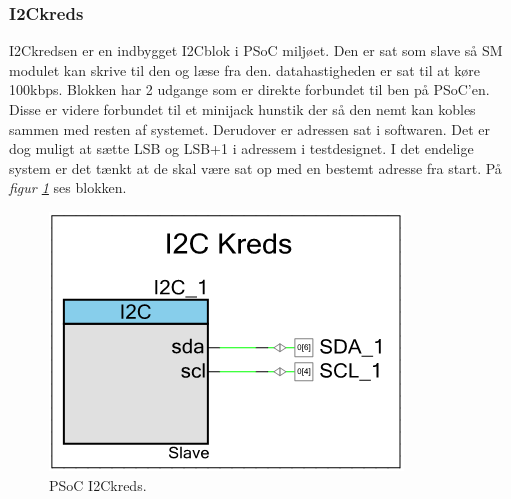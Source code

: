 \subsubsection{I2Ckreds}
I2Ckredsen er en indbygget I2Cblok i PSoC miljøet. Den er sat som slave så SM modulet kan skrive til den og læse fra den. datahastigheden er sat til at køre 100kbps. Blokken har 2 udgange som er direkte forbundet til ben på PSoC'en. Disse er videre forbundet til et minijack hunstik der så den nemt kan kobles sammen med resten af systemet. Derudover er adressen sat i softwaren. Det er dog muligt at sætte LSB og LSB+1 i adressem i testdesignet. I det endelige system er det tænkt at de skal være sat op med en bestemt adresse fra start. På \textit{figur \ref{fig:psoci2ckreds}} ses blokken.
\begin{figure}[H]
\centering
\includegraphics[scale=.5]{billeder/psoci2ckreds}
\caption{PSoC I2Ckreds.}
\label{fig:psoci2ckreds}
\end{figure}
